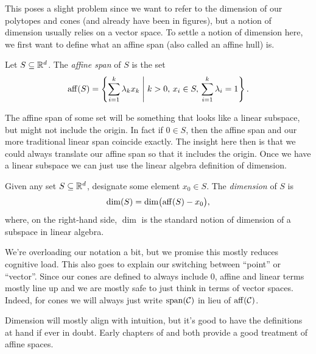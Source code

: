 \documentclass[12pt,oneside]{../../sfsuthesis}
\begin{document}
This poses a slight problem since we want to refer to the dimension of our polytopes and cones (and already have been in figures), but a notion of dimension usually relies on a vector space.
To settle a notion of dimension here, we first want to define what an affine span (also called an affine hull) is.
\begin{definition}\th\label{def:affineSpan}
    Let \( S \subseteq \mathbb{R}^d \).
    The \emph{affine span} of \( S \) is the set
    \[
        \operatorname{aff}(S) = \left\{ \sum_{i=1}^k \lambda_k x_k \; \middle| \; k > 0,\,  x_i \in S,\, \sum_{i=1}^k \lambda_i = 1 \right\}.
    \]
\end{definition}
The affine span of some set will be something that looks like a linear subspace, but might not include the origin.
In fact if \( 0 \in S \), then the affine span and our more traditional linear span coincide exactly.
The insight here then is that we could always translate our affine span so that it includes the origin.
Once we have a linear subspace we can just use the linear algebra definition of dimension.
\begin{definition}\th\label{def:affineDimension}
    Given any set \( S \subseteq \mathbb{R}^d \), designate some element \( x_0 \in S \).
    The \emph{dimension} of \( S \) is
    \[
        \dim(S) = \dim\bigl( \operatorname{aff}(S)-x_0 \bigr),
    \]
    where, on the right-hand side, \( \dim \) is the standard notion of dimension of a subspace in linear algebra.
\end{definition}
We're overloading our notation a bit, but we promise this mostly reduces cognitive load.
This also goes to explain our switching between ``point'' or ``vector''.
Since our cones are defined to always include \( 0 \), affine and linear terms mostly line up and we are mostly safe to just think in terms of vector spaces.
Indeed, for cones we will always just write \( \operatorname{span}(\mathcal{C}) \) in lieu of \( \operatorname{aff}(\mathcal{C}) \).

Dimension will mostly align with intuition, but it's good to have the definitions at hand if ever in doubt.
Early chapters of \cite{zieglerLecturesPolytopes1995} and \cite{grunbaumConvexPolytopes2003} both provide a good treatment of affine spaces.
\end{document}
